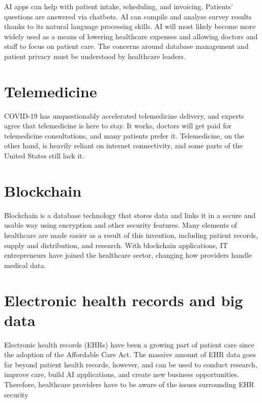 \documentclass[12pt]{article}
\begin{document}
AI apps can help with patient intake, scheduling, and invoicing. Patients' questions are answered via chatbots. AI can compile and analyse survey results thanks to its natural language processing skills. AI will most likely become more widely used as a means of lowering healthcare expenses and allowing doctors and staff to focus on patient care. The concerns around database management and patient privacy must be understood by healthcare leaders.


\section{Telemedicine}

COVID-19 has unquestionably accelerated telemedicine delivery, and experts agree that telemedicine is here to stay. It works, doctors will get paid for telemedicine consultations, and many patients prefer it. Telemedicine, on the other hand, is heavily reliant on internet connectivity, and some parts of the United States still lack it.

\section{Blockchain}
Blockchain is a database technology that stores data and links it in a secure and usable way using encryption and other security features. Many elements of healthcare are made easier as a result of this invention, including patient records, supply and distribution, and research. With blockchain applications, IT entrepreneurs have joined the healthcare sector, changing how providers handle medical data.

\section{Electronic health records and big data}
Electronic health records (EHRs) have been a growing part of patient care
since the adoption of the Affordable Care Act. The massive amount of
EHR data goes far beyond patient health records, however, and can be
used to conduct research, improve care, build AI applications, and create
new business opportunities. Therefore, healthcare providers have to be
aware of the issues surrounding EHR security
\end{document}
